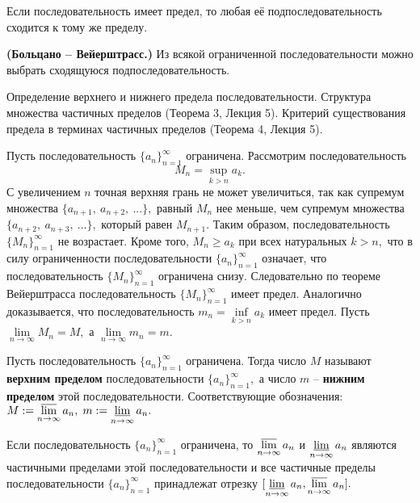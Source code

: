 \begin{lemma}
	Если последовательность имеет предел,
	то любая её подпоследовательность сходится
	к тому же пределу.
\end{lemma}

\begin{theorem}\textbf{(Больцано -- Вейерштрасс.)}
	Из всякой ограниченной последовательности
	можно выбрать сходящуюся подпоследовательность.
\end{theorem}


\newpage
\begin{problem}
Определение верхнего и нижнего предела последовательности. Структура множества
частичных пределов (Теорема 3, Лекция 5). Критерий существования предела в терминах
частичных пределов (Теорема 4, Лекция 5).
\end{problem}

Пусть последовательность
$\{a_n\}_{n=1}^{\infty}$ ограничена.
Рассмотрим последовательность $$M_n=
	\sup\limits_{k>n}a_k.$$ С увеличением
$n$ точная верхняя грань не может
увеличиться, так как супремум
множества $\{a_{n+1}, \ a_{n+2}, \ ...\},$
равный $M_n$ нее меньше, чем супремум
множества $\{a_{n+2}, \ a_{n+3}, \ ...\},$
который равен $M_{n+1}$.
Таким образом, последовательность
$\{M_n\}_{n=1}^{\infty}$ не возрастает.
Кроме того,
$M_n\geq a_k$ при всех натуральных $k>n,$
что в силу ограниченности последовательности
$\{a_n\}_{n=1}^{\infty}$  означает, что
последовательность $\{M_n\}_{n=1}^{\infty}$
ограничена снизу. Следовательно по теореме
Вейерштрасса последовательность
$\{M_n\}_{n=1}^{\infty}$
имеет предел. Аналогично
доказывается, что последовательность
$m_n=\inf\limits_{k>n}a_k$ имеет предел.
Пусть $\lim\limits_{n\rightarrow\infty}
	M_n=M,$ а
$\lim\limits_{n\rightarrow\infty}m_n=m.$
\begin{definition}
	Пусть последовательность
	$\{a_n\}_{n=1}^{\infty}$ ограничена.
	Тогда число $M$ называют \textbf{верхним
		пределом} последовательности
	$\{a_n\}_{n=1}^{\infty},$ а число
	$m$ -- \textbf{нижним пределом}
	этой последовательности.
	Соответствующие обозначения:
	$
		M:=\operatorname*{\overline{lim}}\limits_{n\rightarrow\infty}a_n,\;
		m:=\operatorname*{\underline{lim}}\limits_{n\rightarrow\infty}a_n.
	$
\end{definition}
\begin{theorem}
	Если последовательность $\{a_n\}_{n=1}^{\infty}$
	ограничена, то $\operatorname*{\overline{lim}}\limits_{n\rightarrow\infty}a_n$
	и $\operatorname*{\underline{lim}}\limits_{n\rightarrow\infty}a_n$ являются
	частичными пределами этой последовательности
	и все частичные пределы
	последовательности $\{a_n\}_{n=1}^{\infty}$
	принадлежат отрезку
	$[\operatorname*{\underline{lim}}\limits_{n\rightarrow\infty}a_n,
				\operatorname*{\overline{lim}}\limits_{n\rightarrow\infty}a_n].$
\end{theorem}


